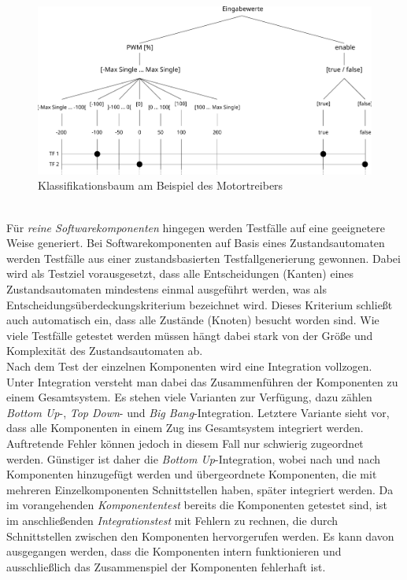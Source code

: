 \begin{figure}%
\includegraphics[width=\columnwidth]{./Bilder/fig_klass}%
\caption{Klassifikationsbaum am Beispiel des Motortreibers}%
\label{fig_klass}%
\end{figure}
\\
Für \textit{reine Softwarekomponenten} hingegen werden Testfälle auf eine geeignetere Weise generiert. Bei Softwarekomponenten auf Basis eines Zustandsautomaten werden Testfälle aus einer zustandsbasierten Testfallgenerierung gewonnen. Dabei wird als Testziel vorausgesetzt, dass alle Entscheidungen (Kanten) eines Zustandsautomaten mindestens einmal ausgeführt werden, was als Entscheidungsüberdeckungskriterium bezeichnet wird. Dieses Kriterium schließt auch automatisch ein, dass alle Zustände (Knoten) besucht worden sind. Wie viele Testfälle getestet werden müssen hängt dabei stark von der Größe und Komplexität des Zustandsautomaten ab.\\
Nach dem Test der einzelnen Komponenten wird eine Integration vollzogen. Unter Integration versteht man dabei das Zusammenführen der Komponenten zu einem Gesamtsystem. Es stehen viele Varianten zur Verfügung, dazu zählen \textit{Bottom Up}-, \textit{Top Down}- und \textit{Big Bang}-Integration. Letztere Variante sieht vor, dass alle Komponenten in einem Zug ins Gesamtsystem integriert werden. Auftretende Fehler können jedoch in diesem Fall nur schwierig zugeordnet werden. Günstiger ist daher die \textit{Bottom Up}-Integration, wobei nach und nach Komponenten hinzugefügt werden und übergeordnete Komponenten, die mit mehreren Einzelkomponenten Schnittstellen haben, später integriert werden. Da im vorangehenden \textit{Komponententest} bereits die Komponenten getestet sind, ist im anschließenden \textit{Integrationstest} mit Fehlern zu rechnen, die durch Schnittstellen zwischen den Komponenten hervorgerufen werden. Es kann davon ausgegangen werden, dass die Komponenten intern funktionieren und ausschließlich das Zusammenspiel der Komponenten fehlerhaft ist. \\
